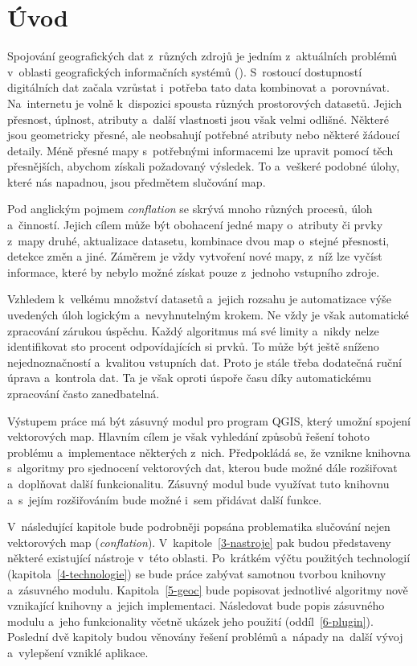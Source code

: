 \chapter{Úvod}
\label{1-uvod}


Spojování geografických dat z~různých zdrojů je jedním z~aktuálních
problémů v~oblasti geografických informačních systémů (). 
S~rostoucí dostupností di\-gitálních dat začala vzrůstat i~potřeba 
tato data kombinovat a~porovnávat. Na~internetu je volně k~dispozici 
spousta různých prostorových datasetů. Jejich přes\-nost, úplnost, 
atributy a~další vlastnosti jsou však velmi odlišné. Některé jsou 
geo\-metricky přesné, ale neobsahují potřebné atributy nebo některé 
žádoucí detaily. Méně přesné mapy s~potřebnými informacemi lze upravit 
pomocí těch přesnějších, abychom získali požadovaný výsledek. To 
a~veškeré podobné úlohy, které nás napadnou, jsou předmětem slučování 
map.

Pod anglickým pojmem \textit{conflation} se skrývá mnoho různých
procesů, úloh a~činností. Jejich cílem může být obohacení jedné mapy 
o~atributy či prvky z~mapy druhé, aktualizace datasetu, kombinace 
dvou map o~stejné přesnosti, detekce změn a jiné. Záměrem je vždy 
vytvoření nové mapy, z~níž lze vyčíst informace, které by nebylo možné
získat pouze z~jednoho vstupního zdroje.

Vzhledem k~velkému množství datasetů a~jejich rozsahu je automatizace
výše uvedených úloh logickým a~nevyhnutelným krokem. Ne vždy je však
automatické zpracování zárukou úspěchu. Každý algoritmus má své limity
a~nikdy nelze identifi\-kovat sto procent odpovídajících si prvků. To může
být ještě sníženo nejednoznač\-ností a~kvalitou vstupních dat. Proto je 
stále třeba dodatečná ruční úprava a~kontrola dat. Ta je však oproti 
úspoře času díky automatickému zpracování často za\-ne\-dbatelná.

Výstupem práce má být zásuvný modul pro program QGIS, který umožní spojení vektorových 
map. Hlavním cílem je však vyhledání způsobů řešení tohoto problému 
a~implementace některých z~nich. Předpokládá se, že vznikne knihovna 
s~algoritmy pro sjednocení vektorových dat, kterou bude možné dále 
rozšiřovat a~doplňovat další funkcionalitu. Zásuvný modul bude využívat 
tuto knihovnu a~s~jejím rozšiřováním bude možné i~sem přidávat další 
funkce.   

V~následující kapitole bude podrobněji popsána problematika slučování 
nejen vektorových map (\textit{conflation}). V~kapitole~\ref{3-nastroje} 
pak budou představeny některé existující nástroje v~této oblasti. 
Po~krátkém výčtu použitých technologií (kapitola~\ref{4-technologie})
se bude práce zabývat samotnou tvorbou knihovny a~zásuvného modulu. 
Kapitola~\ref{5-geoc} bude popisovat jednotlivé algoritmy nově vznikající
knihovny a~jejich implementaci. Následovat bude popis zásuvného modulu 
a~jeho funkcionality včetně ukázek jeho použití (oddíl~\ref{6-plugin}). 
Poslední dvě kapitoly budou věnovány řešení problémů a~nápady na~další 
vývoj a~vylepšení vzniklé aplikace.  

